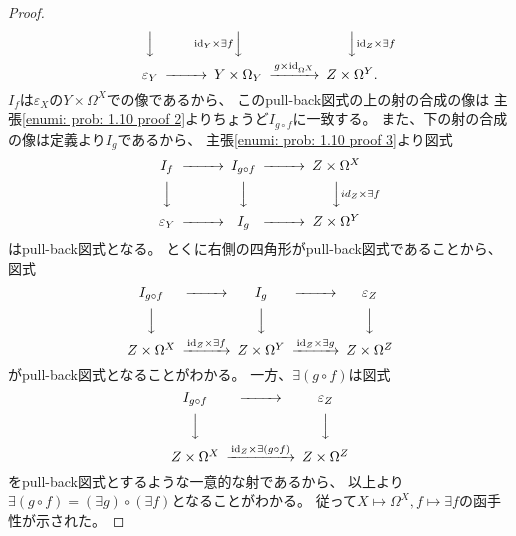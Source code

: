 \documentclass[uplatex]{jsarticle}
\theoremstyle{definition}
\def\ep{\varepsilon}
\def\id{\mathrm{id}}
\begin{document}
\begin{proof}
\[\begin{CD}
    @VVV @V \id_Y \times \exists f VV @VV \id_Z \times \exists f V \\
    \ep_Y @>>> Y\times \Omega_Y @> g\times \id_{\Omega^X} >> Z\times \Omega^Y.
  \end{CD}
  \]
  \(I_f\)は\(\ep_X\)の\(Y\times \Omega^X\)での像であるから、
  このpull-back図式の上の射の合成の像は
  主張\ref{enumi: prob: 1.10 proof 2}よりちょうど\(I_{g\circ f}\)に一致する。
  また、下の射の合成の像は定義より\(I_g\)であるから、
  主張\ref{enumi: prob: 1.10 proof 3}より図式
  \[
  \begin{CD}
    I_f @>>> I_{g\circ f} @>>> Z\times \Omega^X \\
    @VVV @VVV @VV id_Z \times \exists f V \\
    \ep_Y @>>> I_g @>>> Z\times \Omega^Y
  \end{CD}
  \]
  はpull-back図式となる。
  とくに右側の四角形がpull-back図式であることから、図式
  \[
  \begin{CD}
    I_{g\circ f}  @>>> I_g @>>> \ep_Z \\
    @VVV @VVV @VVV \\
    Z\times \Omega^X @> \id_Z \times \exists f >>
    Z\times \Omega^Y @> \id_Z \times \exists g >>
    Z\times \Omega^Z
  \end{CD}
  \]
  がpull-back図式となることがわかる。
  一方、\(\exists (g\circ f)\)は図式
  \[
  \begin{CD}
    I_{g\circ f} @>>> \ep_Z \\
    @VVV @VVV \\
    Z\times \Omega^X @> \id_Z \times \exists (g\circ f) >> Z\times \Omega^Z
  \end{CD}
  \]
  をpull-back図式とするような一意的な射であるから、
  以上より\(\exists (g\circ f) = (\exists g) \circ (\exists f)\)となることがわかる。
  従って\(X\mapsto \Omega^X ,f\mapsto \exists f\)の函手性が示された。


\end{proof}
\end{document}
